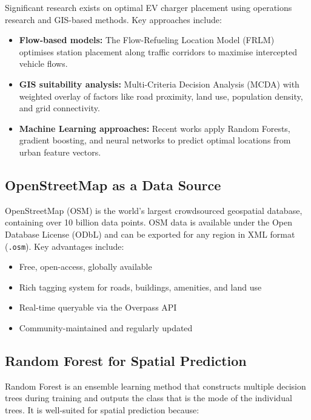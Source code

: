 \documentclass[12pt, a4paper]{article}
\begin{document}
Significant research exists on optimal EV charger placement using 
operations research and GIS-based methods. Key approaches include:

\begin{itemize}
    \item \textbf{Flow-based models:} The Flow-Refueling Location 
    Model (FRLM) optimises station placement along traffic corridors 
    to maximise intercepted vehicle flows.
    \item \textbf{GIS suitability analysis:} Multi-Criteria Decision 
    Analysis (MCDA) with weighted overlay of factors like road 
    proximity, land use, population density, and grid connectivity.
    \item \textbf{Machine Learning approaches:} Recent works apply 
    Random Forests, gradient boosting, and neural networks to predict 
    optimal locations from urban feature vectors.
\end{itemize}

\subsection{OpenStreetMap as a Data Source}

OpenStreetMap (OSM) is the world's largest crowdsourced geospatial 
database, containing over 10 billion data points. OSM data is 
available under the Open Database License (ODbL) and can be exported 
for any region in XML format (\texttt{.osm}). Key advantages include:

\begin{itemize}
    \item Free, open-access, globally available
    \item Rich tagging system for roads, buildings, amenities, and 
    land use
    \item Real-time queryable via the Overpass API
    \item Community-maintained and regularly updated
\end{itemize}

\subsection{Random Forest for Spatial Prediction}

Random Forest is an ensemble learning method that constructs multiple 
decision trees during training and outputs the class that is the mode 
of the individual trees. It is well-suited for spatial prediction 
because:
\end{document}

